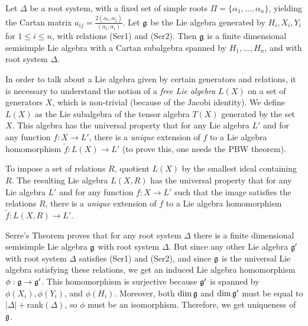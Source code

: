  \begin{theorem}\label{lec16T:Serre} Let $\Delta$ be a root system,
   with a fixed set of simple roots $\Pi=\{\alpha_1,\dots, \alpha_n\}$, yielding the
   Cartan matrix $a_{ij}=\frac{2(\alpha_i,\alpha_j)}{(\alpha_i,\alpha_i)}$. Let $\mathfrak{g}$
   be the Lie algebra generated by $H_i, X_i,Y_i$ for $1\le i\le n$, with relations
   \textrm{(Ser1)} and \textrm{(Ser2)}. Then $\mathfrak{g}$ is a finite dimensional semisimple Lie algebra with a
   Cartan subalgebra spanned by $H_1,\dots, H_n$, and with root system $\Delta$.
 \end{theorem}
 \begin{remark}\label{lec16Rmk:freelie}
   In order to talk about a Lie algebra given by certain generators and relations, it
   is necessary to understand the notion of a \emph{free Lie algebra} $L(X)$ on a set of generators $X$, which is non-trivial (because of
   the Jacobi identity). We define $L(X)$ as the Lie subalgebra of the tensor algebra
   $T(X)$ generated by the set $X$. This algebra has the universal property that for
   any Lie algebra $L'$ and for any function $f:X\to L'$, there is a \emph{unique}
   extension of $f$ to a Lie algebra homomorphism $\tilde f:L(X)\to L'$ (to
   prove this, one needs the PBW theorem).

   To impose a set of relations $R$, quotient $L(X)$ by the smallest ideal containing
   $R$. The resulting Lie algebra $L(X,R)$ has the universal property that for any Lie
   algebra $L'$ and for any function $f:X\to L'$ such that the image satisfies the
   relations $R$, there is a \emph{unique} extension of $f$ to a Lie algebra
   homomorphism $\tilde f:L(X,R)\to L'$.
 \end{remark}
 \begin{remark}
   Serre's Theorem proves that for any root system $\Delta$ there is a finite
   dimensional semisimple Lie algebra $\mathfrak{g}$ with root system $\Delta$. But since any
   other Lie algebra $\mathfrak{g}'$ with root system $\Delta$ satisfies (Ser1) and (Ser2), and
   since $\mathfrak{g}$ is the universal Lie algebra satisfying these relations, we get an
   induced Lie algebra homomorphism $\phi:\mathfrak{g}\to \mathfrak{g}'$. This homomorphism is surjective
   because $\mathfrak{g}'$ is spanned by $\phi(X_i),\phi(Y_i)$, and $\phi(H_i)$. Moreover, both
   $\dim \mathfrak{g}$ and $\dim \mathfrak{g}'$ must be equal to $|\Delta|+$rank$(\Delta)$, so $\phi$ must
   be an isomorphism. Therefore, we get uniqueness of $\mathfrak{g}$.
 \end{remark}

